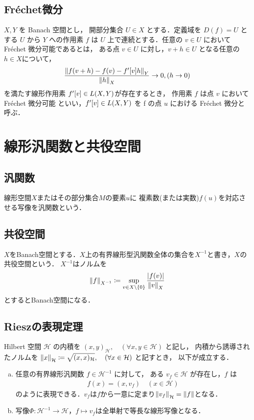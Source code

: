 \subsection{Fr\'{e}chet微分}
\(X, Y\) を Banach 空間とし， 開部分集合 \(U \in X\) とする．定義域を \(D(f) = U\) とする \(U\) から \(Y\)
への作用素 \(f\) は \(U\) 上で連続とする．任意の \(v \in U\) において Fr\'{e}chet 微分可能であるとは， ある点
\(v \in U\) に対し，\(v + h \in U\) となる任意の\(h\in X\)について，
\begin{align}
    \dfrac{ \norm{ f(v+h) - f(v) - f'\qty[v]h }_Y }{\norm{h}_X}\rightarrow 0,(h\rightarrow 0)
\end{align}
を満たす線形作用素 \(f'\qty[v] \in L(X, Y ) \)が存在するとき， 作用素 \(f\) は点 \(v\) において Fr\'{e}chet 微分可能
といい，\( f'\qty[v] \in L(X,Y) \) を f の点 \(u\) における Fr\'{e}chet 微分と呼ぶ．

\section{線形汎関数と共役空間}

\subsection{汎関数}
線形空間\(X\)またはその部分集合\(M\)の要素\(u\)に
複素数(または実数)\(f(u)\)を対応させる写像を汎関数という．
\subsection{共役空間}
\(X\)をBanach空間とする．\(X\)上の有界線形型汎関数全体の集合を\(X^{-1}\)と書き，\(X\)の共役空間という．
\(X^{-1}\)はノルムを
\begin{align}
    \norm{f}_{X^{-1}}
    \coloneqq 
    \sup\limits_{v \in X \backslash \{ 0 \} }\dfrac{|f(v)|}{\norm{v}_X}
\end{align}
とするとBanach空間になる．
\subsection{Rieszの表現定理}
\begin{定理} 
  Hilbert 空間 \(\mathcal{H} \) の内積を 
  \( ( x, y)_{\mathcal{H}} ,\quad (\forall{x, y} \in \mathcal{H}) \) 
  と記し， 内積から誘導されたノルムを
  \(\norm{x}_\mathcal{H} \coloneqq \sqrt{( x, x )_{\mathcal{H}}},\quad(\forall x \in \mathcal{H}) \)
  と記すとき， 以下が成立する．
  \begin{enumerate}[(a)]
      \item 任意の有界線形汎関数 \(f \in \mathcal{H}^{-1}\) に対して， ある \(v_f \in \mathcal{H}\) が存在し，\(f\) は
      \begin{align}
          f(x)=( x,v_f ) \quad (x\in \mathcal{H})
      \end{align}
      のように表現できる．\(v_f\)は\(f\)から一意に定まり\(\norm{v_f}_\mathcal{H}=\norm{f}\)となる．
      \item 写像\(\Phi:\mathcal{H}^{-1}\rightarrow \mathcal{H}\)，\(f\mapsto v_f\)は全単射で等長な線形写像となる．
  \end{enumerate}
\end{定理}
